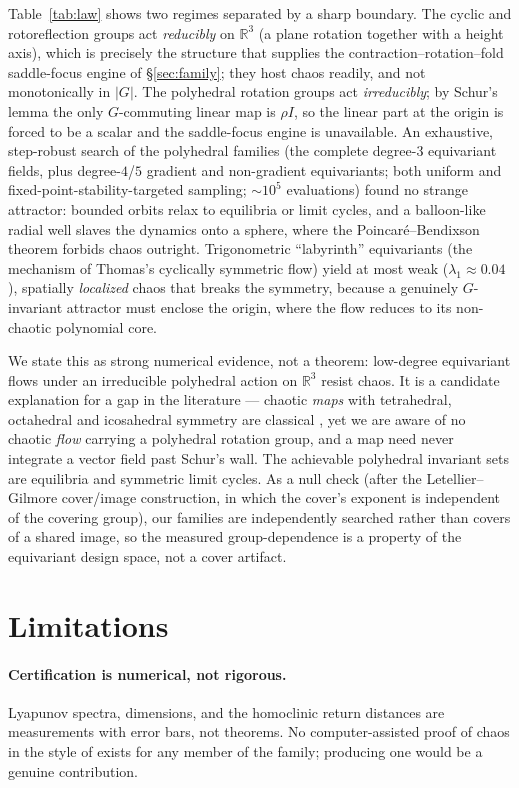 \documentclass[11pt]{article}
\begin{document}
Table~\ref{tab:law} shows two regimes separated by a sharp boundary. The
cyclic and rotoreflection groups act \emph{reducibly} on $\mathbb{R}^3$
(a plane rotation together with a height axis), which is precisely the
structure that supplies the contraction--rotation--fold saddle-focus
engine of \S\ref{sec:family}; they host chaos readily, and not
monotonically in $|G|$. The polyhedral rotation groups act
\emph{irreducibly}; by Schur's lemma the only $G$-commuting linear map is
$\rho I$, so the linear part at the origin is forced to be a scalar and
the saddle-focus engine is unavailable. An exhaustive, step-robust search
of the polyhedral families (the complete degree-$3$ equivariant fields,
plus degree-$4$/$5$ gradient and non-gradient equivariants; both uniform
and fixed-point-stability-targeted sampling; ${\sim}10^5$ evaluations)
found no strange attractor: bounded orbits relax to equilibria or limit
cycles, and a balloon-like radial well slaves the dynamics onto a sphere,
where the Poincar\'e--Bendixson theorem forbids chaos outright.
Trigonometric ``labyrinth'' equivariants (the mechanism of Thomas's
cyclically symmetric flow) yield at most weak ($\lambda_1\approx0.04$),
spatially \emph{localized} chaos that breaks the symmetry, because a
genuinely $G$-invariant attractor must enclose the origin, where the flow
reduces to its non-chaotic polynomial core.

We state this as strong numerical evidence, not a theorem: low-degree
equivariant flows under an irreducible polyhedral action on $\mathbb{R}^3$
resist chaos. It is a candidate explanation for a gap in the literature
--- chaotic \emph{maps} with tetrahedral, octahedral and icosahedral
symmetry are classical \citep{fieldGolubitsky2009}, yet we are aware of no
chaotic \emph{flow} carrying a polyhedral rotation group, and a map need
never integrate a vector field past Schur's wall. The achievable
polyhedral invariant sets are equilibria and symmetric limit cycles. As a
null check (after the Letellier--Gilmore cover/image construction, in
which the cover's exponent is independent of the covering group), our
families are independently searched rather than covers of a shared image,
so the measured group-dependence is a property of the equivariant design
space, not a cover artifact.

\section{Limitations}\label{sec:limitations}

\paragraph{Certification is numerical, not rigorous.}
Lyapunov spectra, dimensions, and the homoclinic return distances are
measurements with error bars, not theorems. No computer-assisted proof of
chaos in the style of \citet{tucker2002} exists for any member of the
family; producing one would be a genuine contribution.
\end{document}
